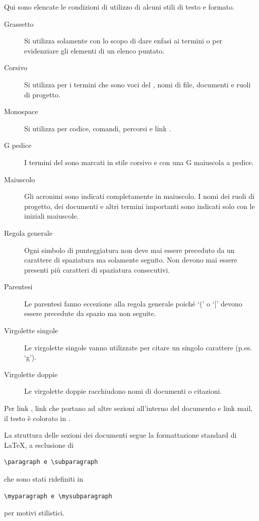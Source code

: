 \documentclass[a4paper, titlepage]{article}
\begin{document}
Qui sono elencate le condizioni di utilizzo di alcuni stili di testo e formato.

\begin{description}
	\item[Grassetto] 
	Si utilizza solamente con lo scopo di dare enfasi ai termini o per evidenziare gli elementi di un elenco puntato.
	\item[Corsivo] 
	Si utilizza per i termini che sono voci del , nomi di file, documenti e ruoli di progetto.
	\item[Monospace] 
	 Si utilizza per codice, comandi, percorsi e link .
	 \item[G pedice]
	 I termini del  sono marcati in stile corsivo e con una G maiuscola a pedice.
	 \item[Maiuscolo]
	 Gli acronimi sono indicati completamente in maiuscolo. I nomi dei ruoli di progetto, dei documenti e altri termini importanti sono indicati solo con le iniziali maiuscole.
\end{description}

\begin{description}
	\item[Regola generale] 
	Ogni simbolo di punteggiatura non deve mai essere preceduto da un carattere di spaziatura ma solamente seguito. Non devono mai essere presenti più caratteri di spaziatura consecutivi.
	\item[Parentesi] 
	Le parentesi fanno eccezione alla regola generale poiché `(' o `[' devono essere precedute da spazio ma non seguite.
	\item[Virgolette singole] 
	Le virgolette singole vanno utilizzate per citare un singolo carattere (p.es. `g').
	\item[Virgolette doppie] 
	Le virgolette doppie racchiudono nomi di documenti o citazioni.
\end{description}

Per link , link che portano ad altre sezioni all'interno del documento e link mail, il testo è colorato in \crule[blue].

La struttura delle sezioni dei documenti segue la formattazione standard di \LaTeX , a esclusione di \begin{verbatim}\paragraph e \subparagraph\end{verbatim} che sono stati ridefiniti in \begin{verbatim}\myparagraph e \mysubparagraph\end{verbatim} per motivi stilistici.
\end{document}

